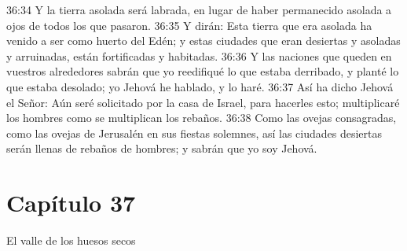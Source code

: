 36:34 Y la tierra asolada será labrada, en lugar de haber permanecido asolada a ojos de todos los que pasaron.   
36:35 Y dirán: Esta tierra que era asolada ha venido a ser como huerto del Edén; y estas ciudades que eran desiertas y asoladas y arruinadas, están fortificadas y habitadas.   
36:36 Y las naciones que queden en vuestros alrededores sabrán que yo reedifiqué lo que estaba derribado, y planté lo que estaba desolado; yo Jehová he hablado, y lo haré.   
36:37 Así ha dicho Jehová el Señor: Aún seré solicitado por la casa de Israel, para hacerles esto; multiplicaré los hombres como se multiplican los rebaños.   
36:38 Como las ovejas consagradas, como las ovejas de Jerusalén en sus fiestas solemnes, así las ciudades desiertas serán llenas de rebaños de hombres; y sabrán que yo soy Jehová.   
\section*{Capítulo 37 } 
El valle de los huesos secos   
  
